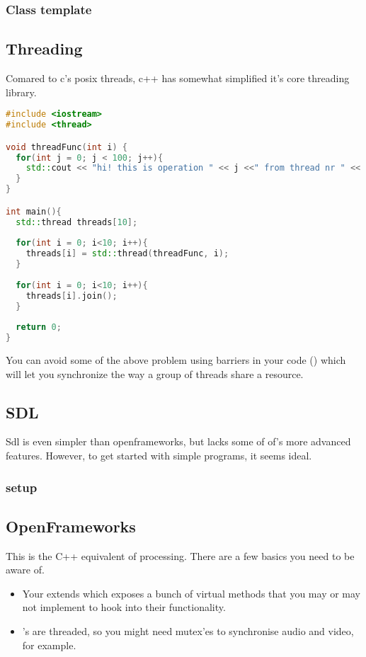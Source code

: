 \subsubsection{Class template}


\subsection{Threading} 
Comared to c's posix threads, c++ has somewhat simplified it's core threading library. 
\begin{lstlisting}[language=c++]
#include <iostream>
#include <thread>

void threadFunc(int i) {
  for(int j = 0; j < 100; j++){
    std::cout << "hi! this is operation " << j <<" from thread nr " << i << std::endl;
  }
}

int main(){
  std::thread threads[10];
  
  for(int i = 0; i<10; i++){
    threads[i] = std::thread(threadFunc, i);
  }
  
  for(int i = 0; i<10; i++){
    threads[i].join();
  }
  
  return 0;
}
\end{lstlisting}
You can avoid some of the above problem using barriers in your code () which will let you synchronize the way a group of threads share a resource.

\subsection{SDL}

Sdl is even simpler than openframeworks, but lacks some of of's more advanced features. However, to get started with simple programs, it seems ideal. 

\subsubsection{setup}


\subsection{OpenFrameworks}

This is the C++ equivalent of processing. There are a few basics you need to be aware of. 

\begin{itemize}
    \item Your  extends  which exposes a bunch of virtual methods that you may or may not implement to hook into their functionality. 
    \item {}'s are threaded, so you might need mutex'es to synchronise audio and video, for example. 
\end{itemize}


